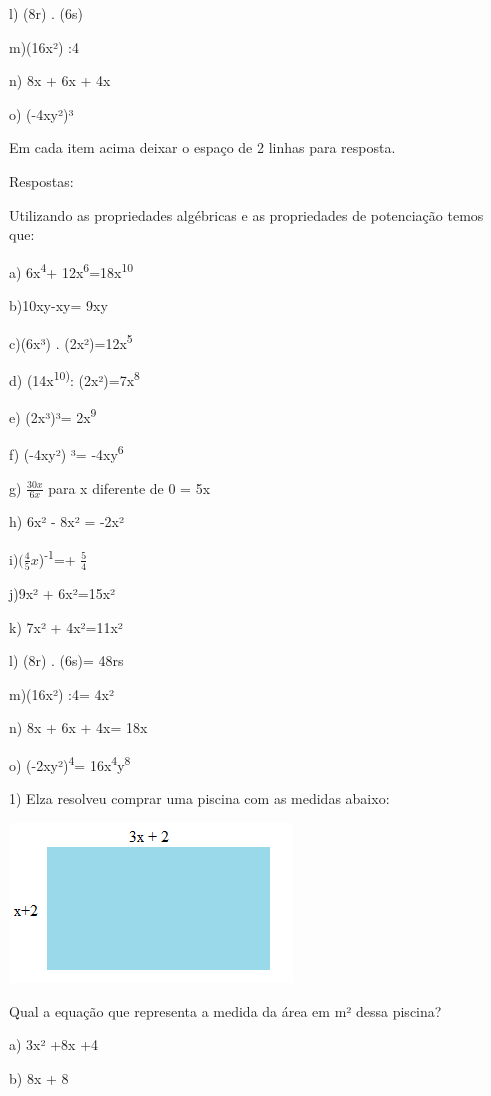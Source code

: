 l) (8r) . (6s)

m)(16x²) :4

n) 8x + 6x + 4x

o) (-4xy²)³

Em cada item acima deixar o espaço de 2 linhas para resposta.

Respostas:

Utilizando as propriedades algébricas e as propriedades de potenciação
temos que:

a) 6x\textsuperscript{4}+ 12x\textsuperscript{6}=18x\textsuperscript{10}

b)10xy-xy= 9xy

c)(6x³) . (2x²)=12x\textsuperscript{5}

d) (14x\textsuperscript{10)}: (2x²)=7x\textsuperscript{8}

e) (2x³)³= 2x\textsuperscript{9}

f) (-4xy²) ³= -4xy\textsuperscript{6}

g) \(\frac{30x}{6x}\) para x diferente de 0 = 5x

h) 6x² - 8x² = -2x²

i)\((\frac{4}{5}x\))\textsuperscript{-1}=+ \(\frac{5}{4}\)

j)9x² + 6x²=15x²

k) 7x² + 4x²=11x²

l) (8r) . (6s)= 48rs

m)(16x²) :4= 4x²

n) 8x + 6x + 4x= 18x

o) (-2xy²)\textsuperscript{4}=
16x\textsuperscript{4}y\textsuperscript{8}


1) Elza resolveu comprar uma piscina com as medidas abaixo:

\includegraphics[width=2.9625in,height=1.67014in]{./imgSAEB_8_MAT/media/image6.png}

Qual a equação que representa a medida da área em m² dessa piscina?

a) 3x² +8x +4

b) 8x + 8

